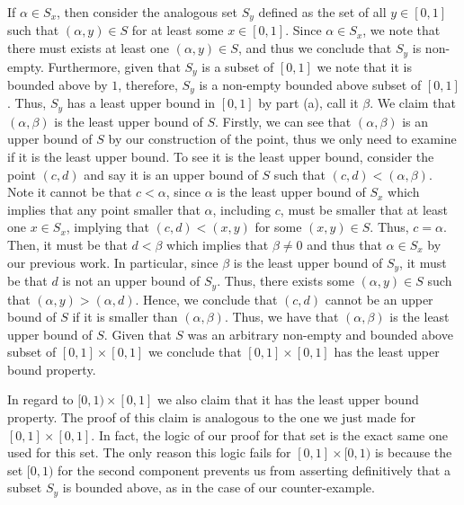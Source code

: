 \documentclass[12pt]{article}
\begin{document}
\begin{enumerate}[label=(\alph*)]
	If $\alpha \in S_x$, then consider the analogous set $S_y$ defined as the set of all $y \in [0, 1]$
	such that $(\alpha, y) \in S$ for at least some $x \in [0, 1]$. Since $\alpha \in S_x$, we note that 
	there must exists at least one $(\alpha, y) \in S$, and thus we conclude that $S_y$ is non-empty.
	Furthermore, given that $S_y$ is a subset of $[0, 1]$ we note that it is bounded above by $1$, therefore,
	$S_y$ is a non-empty bounded above subset of $[0, 1]$. Thus, $S_y$ has a least upper bound in $[0, 1]$
	by part (a), call it $\beta$. We claim that $(\alpha, \beta)$ is the least upper bound of $S$.
	Firstly, we can see that $(\alpha, \beta)$ is an upper bound of $S$ by our construction of the point, thus
	we only need to examine if it is the least upper bound. To see it is the least upper bound, consider
	the point $(c, d)$ and say it is an upper bound of $S$ such that $(c, d) < (\alpha, \beta)$. Note
	it cannot be that $c < \alpha$, since $\alpha$ is the least upper bound of $S_x$ which implies that 
	any point smaller that $\alpha$, including $c$, must be smaller that at least one $x \in S_x$, implying that 
	$(c, d) < (x, y)$ for some $(x, y) \in S$. Thus, $c = \alpha$. Then, it must be that 
	$d < \beta$ which implies that $\beta \neq 0$ and thus that $\alpha \in S_x$ by our previous work. In particular,
	since $\beta$ is the least upper bound of $S_y$, it must be that $d$ is not an upper bound of $S_y$.
	Thus, there exists some $(\alpha, y) \in S$ such that $(\alpha, y) > (\alpha, d)$. Hence, we conclude
	that $(c, d)$ cannot be an upper bound of $S$ if it is smaller than $(\alpha, \beta)$. Thus, we 
	have that $(\alpha, \beta)$ is the least upper bound of $S$. Given that $S$ was an arbitrary non-empty
	and bounded above subset of $[0, 1] \times [0, 1]$ we conclude that $[0, 1] \times [0,1]$ has the
	least upper bound property.
	
	In regard to $[0,1) \times [0,1]$ we also claim that it has the least upper bound property. The proof
	of this claim is analogous to the one we just made for $[0, 1] \times [0,1]$. In fact, the logic
	of our proof for that set is the exact same one used for this set. The only reason this logic fails
	for $[0,1] \times [0,1)$ is because the set $[0,1)$ for the second component prevents us from 
	asserting definitively that a subset $S_y$ is bounded above, as in the case of our counter-example. 
	\end{enumerate} 
 
\end{document}
